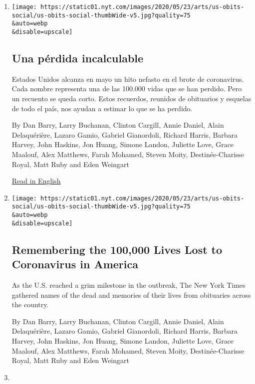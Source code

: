 \begin{enumerate}
\def\labelenumi{\arabic{enumi}.}
\item
  \href{/es/2020/05/26/espanol/mundo/100000-victimas-covid-estados-unidos.html}{}

  \texttt{[image: https://static01.nyt.com/images/2020/05/23/arts/us-obits-social/us-obits-social-thumbWide-v5.jpg?quality=75\\\&auto=webp\\\&disable=upscale]}

  \hypertarget{una-puxe9rdida-incalculable}{%
  \subsection{Una pérdida
  incalculable}\label{una-puxe9rdida-incalculable}}

  Estados Unidos alcanza en mayo un hito nefasto en el brote de
  coronavirus. Cada nombre representa una de las 100.000 vidas que se
  han perdido. Pero un recuento se queda corto. Estos recuerdos,
  reunidos de obituarios y esquelas de todo el país, nos ayudan a
  estimar lo que se ha perdido.

  By Dan Barry, Larry Buchanan, Clinton Cargill, Annie Daniel, Alain
  Delaquérière, Lazaro Gamio, Gabriel Gianordoli, Richard Harris,
  Barbara Harvey, John Haskins, Jon Huang, Simone Landon, Juliette Love,
  Grace Maalouf, Alex Matthews, Farah Mohamed, Steven Moity,
  Destinée-Charisse Royal, Matt Ruby and Eden Weingart

  \href{https://www.nytimes.com/interactive/2020/05/24/us/us-coronavirus-deaths-100000.html}{Read
  in English}
\item
  \href{/interactive/2020/05/24/us/us-coronavirus-deaths-100000.html}{}

  \texttt{[image: https://static01.nyt.com/images/2020/05/23/arts/us-obits-social/us-obits-social-thumbWide-v5.jpg?quality=75\\\&auto=webp\\\&disable=upscale]}

  \hypertarget{remembering-the-100000-lives-lost-to-coronavirus-in-america}{%
  \subsection{Remembering the 100,000 Lives Lost to Coronavirus in
  America}\label{remembering-the-100000-lives-lost-to-coronavirus-in-america}}

  As the U.S. reached a grim milestone in the outbreak, The New York
  Times gathered names of the dead and memories of their lives from
  obituaries across the country.

  By Dan Barry, Larry Buchanan, Clinton Cargill, Annie Daniel, Alain
  Delaquérière, Lazaro Gamio, Gabriel Gianordoli, Richard Harris,
  Barbara Harvey, John Haskins, Jon Huang, Simone Landon, Juliette Love,
  Grace Maalouf, Alex Matthews, Farah Mohamed, Steven Moity,
  Destinée-Charisse Royal, Matt Ruby and Eden Weingart
\item
  \href{/2020/03/11/climate/government-land-eviction-floods.html}{}


\end{enumerate}
